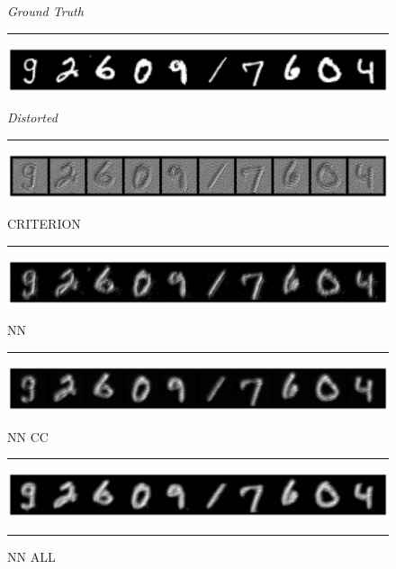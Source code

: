 \begin{figure}
    \centering
    \setlength{\abovecaptionskip}{0pt plus 0pt minus 0pt}
    \setlength{\belowcaptionskip}{16pt plus 0pt minus 0pt}
    
    \caption*{\normalsize{\textit{Ground Truth}}}
    \rule{0.4\textwidth}{.4pt}
    
    \centerline{\hspace*{8mm}\includegraphics[width=1.4\textwidth]{figures/reconstruction_MNIST_ground_truth.png}}
    \caption*{\normalsize{\textit{Distorted}}}
    \rule{0.4\textwidth}{.4pt}
    
    \centerline{\hspace*{8mm}\includegraphics[width=1.4\textwidth]{figures/reconstruction_MNIST_distorted.png}}
    \caption*{\normalsize{CRITERION}}
    \rule{0.4\textwidth}{.4pt}
    
    \centerline{\hspace*{8mm}\includegraphics[width=1.4\textwidth]{figures/reconstruction_MNIST_CRITERION_epoch_100.png}}
    \caption*{\normalsize{NN}}
    \rule{0.4\textwidth}{.4pt}
    
    \centerline{\hspace*{8mm}\includegraphics[width=1.4\textwidth]{figures/reconstruction_MNIST_NN_epoch_100.png}}
    \caption*{\normalsize{NN CC}}
    \rule{0.4\textwidth}{.4pt}
    
    \centerline{\hspace*{8mm}\includegraphics[width=1.4\textwidth]{figures/reconstruction_MNIST_NN_CC_epoch_100.png}}
    \caption*{\normalsize{NN ALL}}
    \rule{0.4\textwidth}{.4pt}
    

\end{figure}
